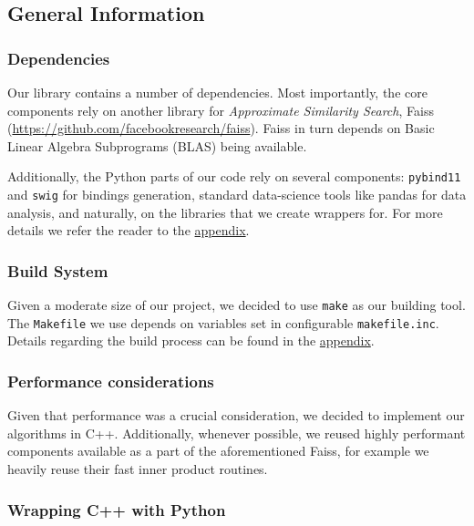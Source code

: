 
\subsection{General Information}

        
    \subsubsection{Dependencies}
    
        Our library contains a number of dependencies. Most importantly, the core components rely on 
        another library for \textit{Approximate Similarity Search}, Faiss (\url{https://github.com/facebookresearch/faiss}).
        Faiss in turn depends on Basic Linear Algebra Subprograms (BLAS) being available.
        
        Additionally, the Python parts of our code rely on several components: \texttt{pybind11} and \texttt{swig}
        for bindings generation, standard data-science tools like pandas for data analysis, and naturally, on the
        libraries that we create wrappers for. For more details we refer the reader to the \hyperref[sec:appendices]{appendix}.
    
    \subsubsection{Build System}
        
        Given a moderate size of our project, we decided to use \texttt{make} as our building tool. The \texttt{Makefile} we use
        depends on variables set in configurable \texttt{makefile.inc}. Details regarding the build process can be found in the \hyperref[sec:appendices]{appendix}.
        
    \subsubsection{Performance considerations}
        
        Given that performance was a crucial consideration, we decided to implement our algorithms in C++.
        Additionally, whenever possible, we reused highly performant components available as a part of the aforementioned Faiss,
        for example we heavily reuse their fast inner product routines. 
        
    \subsubsection{Wrapping C++ with Python}
        
